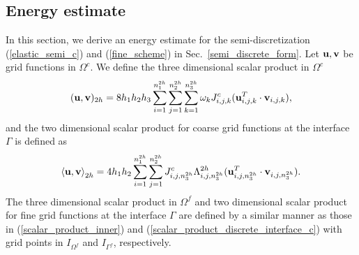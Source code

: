 \subsection{Energy estimate}\label{sec_energy}
In this section, we derive an energy estimate for the semi-discretization (\ref{elastic_semi_c}) and (\ref{fine_scheme}) in Sec.~\ref{semi_discrete_form}. Let ${\bf u}, {\bf v}$ be grid functions in $\Omega^c$. We define the three dimensional scalar product in $\Omega^c$
\begin{equation}\label{scalar_product_inner}
({\bf u}, {\bf v})_{2h} = 8h_1h_2h_3\sum_{i=1}^{n_1^{2h}}\sum_{j=1}^{n_2^{2h}}\sum_{k=1}^{n_3^{2h}}\omega_k{J}_{i,j,k}^{c}({\bf u}_{i,j,k}^T\cdot {\bf v}_{i,j,k}),
\end{equation}
and the two dimensional scalar product for coarse grid functions at the interface $\Gamma$ is defined as 
\begin{equation}\label{scalar_product_discrete_interface_c}
\left<{\bf u}, {\bf v}\right>_{2h} = 4h_1h_2\sum_{i=1}^{n_1^{2h}}\sum_{j=1}^{n_2^{2h}}{  J}_{i,j,n_3^{2h}}^{c}\Lambda^{2h}_{i,j,n_3^{2h}}({\bf u}_{i,j,n_3^{2h}}^T\cdot {\bf v}_{i,j,n_3^{2h}}).
\end{equation}
The three dimensional scalar product in $\Omega^f$ and two dimensional scalar product for fine grid functions at the interface $\Gamma$ are defined by a similar manner as those in (\ref{scalar_product_inner}) and (\ref{scalar_product_discrete_interface_c}) with grid points in $I_{\Omega^f}$ and $I_{\Gamma^f}$, respectively. 

